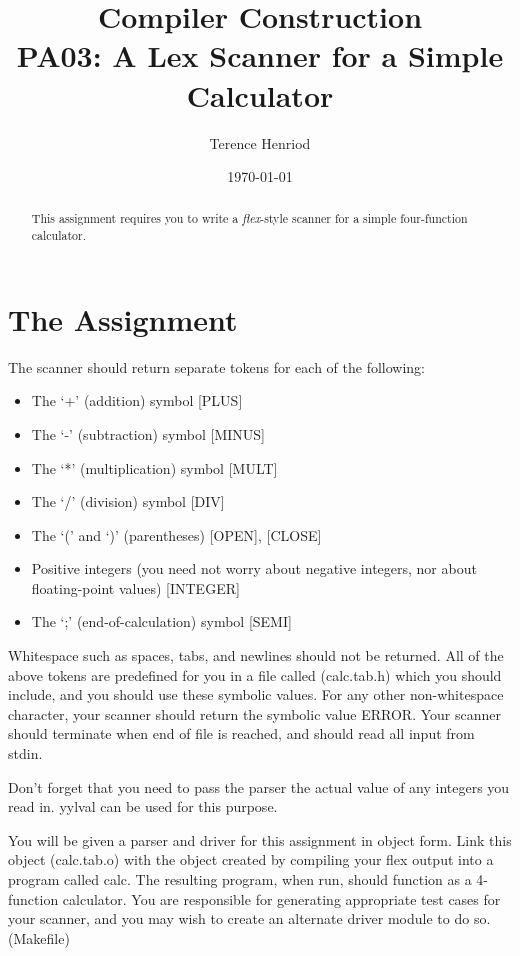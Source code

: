 \documentclass{article}
\title{Compiler Construction \\ PA03: A Lex Scanner for a Simple Calculator}
\author{Terence Henriod}
\date{\today}
\begin{document}
\clearpage            %
\maketitle            %
\thispagestyle{empty} %

\begin{abstract}
\noindent This assignment requires you to write a \textit{flex}-style scanner for a simple four-function calculator.
\end{abstract}

\newpage
\section{The Assignment}
The scanner should return separate tokens for each of the following:
\begin{itemize}
  \item The `+' (addition) symbol [PLUS]
  \item The `-' (subtraction) symbol [MINUS]
  \item The `*' (multiplication) symbol [MULT]
  \item The `/' (division) symbol [DIV]
  \item The `(' and `)' (parentheses) [OPEN], [CLOSE]
  \item Positive integers (you need not worry about negative integers, nor about floating-point values) [INTEGER]
  \item The `;' (end-of-calculation) symbol [SEMI]
\end{itemize}
Whitespace such as spaces, tabs, and newlines should not be returned. All of the above tokens are predefined for you in a file called (calc.tab.h) which you should include, and you should use these symbolic values. For any other non-whitespace character, your scanner should return the symbolic value ERROR. Your scanner should terminate when end of file is reached, and should read all input from stdin.

Don't forget that you need to pass the parser the actual value of any integers you read in. yylval can be used for this purpose.

You will be given a parser and driver for this assignment in object form. Link this object (calc.tab.o) with the object created by compiling your flex output into a program called calc. The resulting program, when run, should function as a 4-function calculator. You are responsible for generating appropriate test cases for your scanner, and you may wish to create an alternate driver module to do so. (Makefile)
\end{document}
